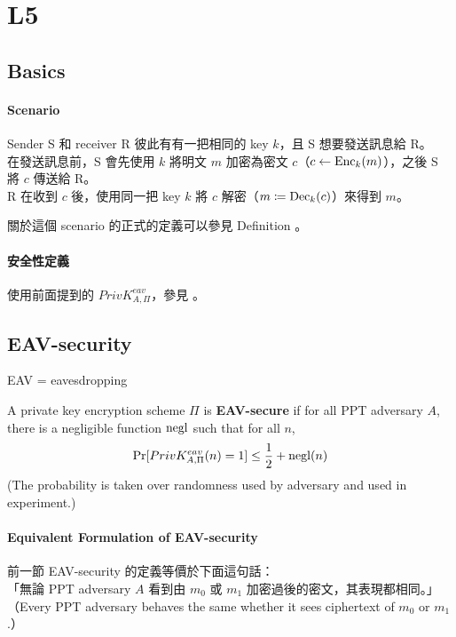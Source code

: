 \section{L5}


\subsection{Basics}


\paragraph{Scenario}

Sender S 和 receiver R 彼此有有一把相同的 key \(k\)，且 S 想要發送訊息給 R。 \\
在發送訊息前，S 會先使用 \(k\) 將明文 \(m\) 加密為密文 \(c\)（\(c \leftarrow \operatorname{Enc}_k(m)\)），之後 S 將 \(c\) 傳送給 R。 \\
R 在收到 \(c\) 後，使用同一把 key \(k\) 將 \(c\) 解密（\(m \coloneq \operatorname{Dec}_k(c)\)）來得到 \(m\)。

關於這個 scenario 的正式的定義可以參見 Definition 。


\paragraph{安全性定義}

使用前面提到的 \(PrivK_{A, \Pi}^{eav}\)，參見 。


\subsection{EAV-security}

EAV = eavesdropping

\begin{definition}
	A private key encryption scheme \(\Pi\) is \textbf{EAV-secure} if for all PPT adversary \(A\), there is a negligible function \(\operatorname{negl}\) such that for all \(n\),
	\[\Pr[PrivK_{A, \Pi}^{eav}(n) = 1] \leq \frac{1}{2} + \operatorname{negl}(n)\]
	(The probability is taken over randomness used by adversary and used in experiment.)
\end{definition}


\paragraph{Equivalent Formulation of EAV-security}

前一節 EAV-security 的定義等價於下面這句話： \\
「無論 PPT adversary \(A\) 看到由 \(m_0\) 或 \(m_1\) 加密過後的密文，其表現都相同。」 \\
（Every PPT adversary behaves the same whether it sees ciphertext of \(m_0\) or \(m_1\).）

